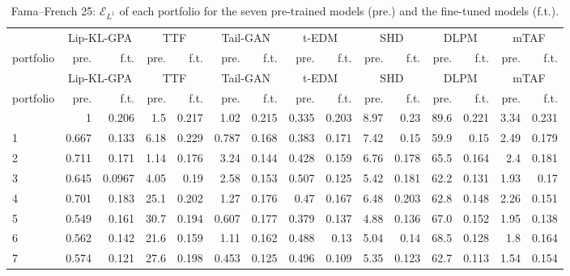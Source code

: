 \begin{longtable}{l rr rr rr rr rr rr rr}
\caption{Fama--French 25: $\mathcal{E}_{L^1}$ of each portfolio for the seven pre-trained models (pre.) and the fine-tuned models (f.t.).}\label{tab:ff25_l1}\\ \toprule
 & \multicolumn{2}{c}{Lip-KL-GPA} & \multicolumn{2}{c}{TTF} & \multicolumn{2}{c}{Tail-GAN} & \multicolumn{2}{c}{t-EDM} & \multicolumn{2}{c}{SHD} & \multicolumn{2}{c}{DLPM} & \multicolumn{2}{c}{mTAF}\\
\cmidrule(lr){2-3} \cmidrule(lr){4-5} \cmidrule(lr){6-7} \cmidrule(lr){8-9} \cmidrule(lr){10-11} \cmidrule(lr){12-13} \cmidrule(lr){14-15}
portfolio & pre. & f.t. & pre. & f.t. & pre. & f.t. & pre. & f.t. & pre. & f.t. & pre. & f.t. & pre. & f.t.\\ \midrule \endfirsthead
\toprule  & \multicolumn{2}{c}{Lip-KL-GPA} & \multicolumn{2}{c}{TTF} & \multicolumn{2}{c}{Tail-GAN} & \multicolumn{2}{c}{{t-EDM}} & \multicolumn{2}{c}{SHD} & \multicolumn{2}{c}{DLPM} & \multicolumn{2}{c}{mTAF}\\
\cmidrule(lr){2-3} \cmidrule(lr){4-5} \cmidrule(lr){6-7} \cmidrule(lr){8-9} \cmidrule(lr){10-11} \cmidrule(lr){12-13} \cmidrule(lr){14-15}
portfolio & pre. & f.t. & pre. & f.t. & pre. & f.t. & pre. & f.t. & pre. & f.t. & pre. & f.t. & pre. & f.t.\\ \midrule \endhead \bottomrule \endfoot
0 & 1 & {0.206} & 1.5 & {0.217} & 1.02 & {0.215} & 0.335 & {0.203} & 8.97 & {0.23} & 89.6 & {0.221} & 3.34 & {0.231}\\
1 & 0.667 & {0.133} & 6.18 & {0.229} & 0.787 & {0.168} & 0.383 & {0.171} & 7.42 & {0.15} & 59.9 & {0.15} & 2.49 & {0.179}\\
2 & 0.711 & {0.171} & 1.14 & {0.176} & 3.24 & {0.144} & 0.428 & {0.159} & 6.76 & {0.178} & 65.5 & {0.164} & 2.4 & {0.181}\\
3 & 0.645 & {0.0967} & 4.05 & {0.19} & 2.58 & {0.153} & 0.507 & {0.125} & 5.42 & {0.181} & 62.2 & {0.131} & 1.93 & {0.17}\\
4 & 0.701 & {0.183} & 25.1 & {0.202} & 1.27 & {0.176} & 0.47 & {0.167} & 6.48 & {0.203} & 62.8 & {0.148} & 2.26 & {0.151}\\
5 & 0.549 & {0.161} & 30.7 & {0.194} & 0.607 & {0.177} & 0.379 & {0.137} & 4.88 & {0.136} & 67.0 & {0.152} & 1.95 & {0.138}\\
6 & 0.562 & {0.142} & 21.6 & {0.159} & 1.11 & {0.162} & 0.488 & {0.13} & 5.04 & {0.14} & 68.5 & {0.128} & 1.8 & {0.164}\\
7 & 0.574 & {0.121} & 27.6 & {0.198} & 0.453 & {0.125} & 0.496 & {0.109} & 5.35 & {0.123} & 62.7 & {0.113} & 1.54 & {0.154}\\

\end{longtable}
